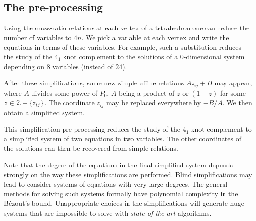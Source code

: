 



\subsection{The pre-processing}\label{sec-prepro}

Using the cross-ratio relations at each vertex of a tetrahedron one can reduce the number of variables to $4n$.
We pick a variable at each vertex and write the equations in terms of these variables.
For example, such a substitution
reduces the study of the $4_1$ knot complement to the solutions of a 0-dimensional system depending on $8$ variables
(instead of $24$).

After these simplifications, some new simple affine relations  $A z_{ij}+B$ may appear,
where $A$ divides some power of $P_0$,  $A$ being a product of $z$ or $(1-z)$ for some $z \in {\mathcal Z} - \{ z_{ij} \}$. The coordinate $z_{ij}$ may be replaced everywhere by $-{B}/{A}$. We then obtain a simplified system.

This simplification pre-processing reduces the study of the $4_1$ knot complement to a simplified system of two equations in two variables. The other coordinates of the solutions can then be recovered from simple relations.

Note that the degree of the equations in the final simplified system depends strongly on the way these simplifications are performed.
Blind simplifications may lead to consider systems of equations with very large degrees. The general methods for solving such systems formally have polynomial complexity in the Bézout's bound. Unappropriate choices in the simplifications will generate huge systems that are impossible to solve with {\em state of the art} algorithms. %


